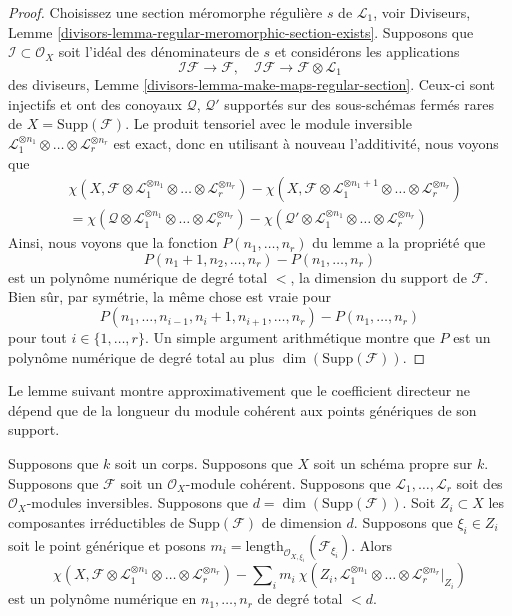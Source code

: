 \begin{proof}
\medskip\noindent
Choisissez une section méromorphe régulière $s$ de
$\mathcal{L}_1$, voir Diviseurs, Lemme
\ref{divisors-lemma-regular-meromorphic-section-exists}. Supposons que $\mathcal{I}
\subset \mathcal{O}_X$ soit l'idéal des dénominateurs de $s$ et considérons les applications
$$
\mathcal{I}\mathcal{F} \to \mathcal{F},\quad
\mathcal{I}\mathcal{F} \to \mathcal{F} \otimes \mathcal{L}_1
$$
des diviseurs, Lemme
\ref{divisors-lemma-make-maps-regular-section}. Ceux-ci sont
injectifs et ont des conoyaux $\mathcal{Q}$, $\mathcal{Q}'$
supportés sur des sous-schémas fermés rares de $X =
\text{Supp}(\mathcal{F})$. Le produit tensoriel avec le module inversible
$\mathcal{L}_1^{\otimes n_1} \otimes \ldots \otimes \mathcal{L}_r^{\otimes
n_r}$ est exact, donc en utilisant à nouveau l'additivité, nous voyons que
\begin{align*}
&\chi(X, \mathcal{F} \otimes \mathcal{L}_1^{\otimes n_1} \otimes \ldots \otimes
\mathcal{L}_r^{\otimes n_r}) -
\chi(X, \mathcal{F} \otimes \mathcal{L}_1^{\otimes n_1 + 1}
\otimes \ldots \otimes \mathcal{L}_r^{\otimes n_r}) \\
& =
\chi(\mathcal{Q} \otimes \mathcal{L}_1^{\otimes n_1} \otimes \ldots \otimes
\mathcal{L}_r^{\otimes n_r}) -
\chi(\mathcal{Q}' \otimes \mathcal{L}_1^{\otimes n_1} \otimes \ldots \otimes
\mathcal{L}_r^{\otimes n_r})
\end{align*}
Ainsi, nous voyons que la fonction $P(n_1,
\ldots, n_r)$ du lemme a la propriété que
$$
P(n_1 + 1, n_2, \ldots, n_r) - P(n_1, \ldots, n_r)
$$
est un polynôme numérique de degré total $<$,
la dimension du support de $\mathcal{F}$. Bien
sûr, par symétrie, la même chose est vraie pour
$$
P(n_1, \ldots, n_{i - 1}, n_i + 1, n_{i + 1}, \ldots, n_r)
- P(n_1, \ldots, n_r)
$$
pour tout $i \in \{1, \ldots, r\}$. Un simple argument
arithmétique montre que $P$ est un polynôme numérique
de degré total au plus $\dim(\text{Supp}(\mathcal{F}))$.
\end{proof}

\noindent
Le lemme suivant montre approximativement que le
coefficient directeur ne dépend que de la longueur du
module cohérent aux points génériques de son support.

\begin{lemma}
\label{lemma-numerical-polynomial-leading-term}
Supposons que $k$ soit un corps. Supposons que $X$ soit un
schéma propre sur $k$. Supposons que $\mathcal{F}$ soit un
$\mathcal{O}_X$-module cohérent. Supposons que
$\mathcal{L}_1, \ldots, \mathcal{L}_r$ soit des
$\mathcal{O}_X$-modules inversibles. Supposons que $d =
\dim(\text{Supp}(\mathcal{F}))$. Soit $Z_i \subset X$ les
composantes irréductibles de $\text{Supp}(\mathcal{F})$ de dimension
$d$. Supposons que $\xi_i \in Z_i$ soit le point générique et posons
$m_i = \text{length}_{\mathcal{O}_{X, \xi_i}}(\mathcal{F}_{\xi_i})$. Alors
$$
\chi(X, \mathcal{F} \otimes \mathcal{L}_1^{\otimes n_1} \otimes \ldots \otimes
\mathcal{L}_r^{\otimes n_r}) -
\sum\nolimits_i
m_i\ \chi(Z_i, \mathcal{L}_1^{\otimes n_1} \otimes \ldots \otimes
\mathcal{L}_r^{\otimes n_r}|_{Z_i})
$$
est un polynôme numérique en $n_1, \ldots, n_r$ de degré total $< d$.
\end{lemma}

